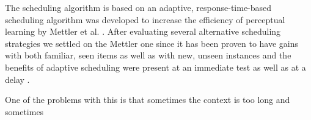 The scheduling algorithm is based on an adaptive, response-time-based scheduling algorithm was developed to increase the efficiency of perceptual learning by Mettler et al. \cite{Mettler14-ARTS}. After evaluating several alternative scheduling strategies we settled on the Mettler one since it has been proven to have gains with both familiar, seen items as well as with new, unseen instances and the benefits of adaptive scheduling were present at an immediate test as well as at a delay \cite{Mettler14-ARTS}.



One of the problems with this is that sometimes the context is too long and sometimes 

